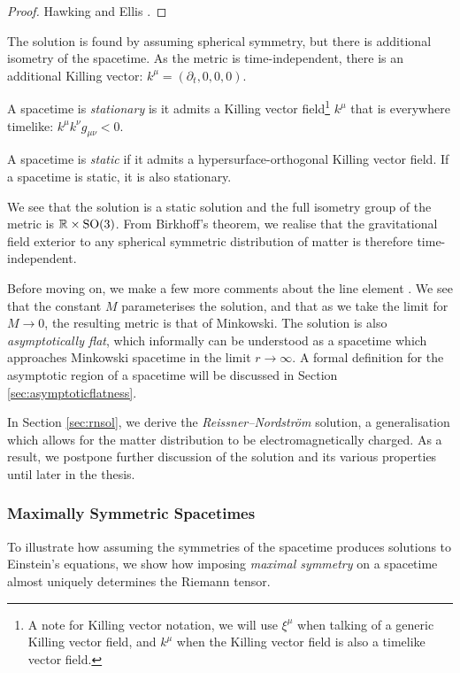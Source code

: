 \begin{proof}
	Hawking and Ellis \cite{Hawking:1973uf}.
\end{proof}

The \sch solution is found by assuming spherical symmetry, but there is additional isometry of the spacetime. As the metric  is time-independent, there is an additional Killing vector: $k^\mu = (\partial_t, 0,0,0)$.
\begin{defn}
	A spacetime is \emph{stationary} is it admits a Killing vector field\footnote{A note for Killing vector notation, we will use $\xi^\mu$ when talking of a generic Killing vector field, and $k^\mu$ when the Killing vector field is also a timelike vector field.} $k^\mu$ that is everywhere timelike: $k^\mu k^\nu g_{\mu \nu} < 0$.
\end{defn}
\begin{defn}
	A spacetime is \emph{static} if it admits a hypersurface-orthogonal Killing vector field. If a spacetime is static, it is also stationary.
\end{defn}
We see that the \sch solution is a static solution and the full isometry group of the metric is ${\mathbb{R}} \times \text{SO}(3)$. From Birkhoff's theorem, we realise that the gravitational field exterior to any spherical symmetric distribution of matter is therefore time-independent.

Before moving on, we make a few more comments about the line element . We see that the constant $M$ parameterises the solution, and that as we take the limit for $M \rightarrow 0$, the resulting metric is that of Minkowski. The \sch solution is also \emph{asymptotically flat}, which informally can be understood as a spacetime which approaches Minkowski spacetime in the limit $r \rightarrow \infty$. A formal definition for the asymptotic region of a spacetime will be discussed in Section \ref{sec:asymptoticflatness}.

In Section \ref{sec:rnsol}, we derive the \emph{Reissner–Nordstr\"om} solution, a generalisation which allows for the matter distribution to be electromagnetically charged. As a result, we postpone further discussion of the \sch solution and its various properties until later in the thesis.

\subsubsection{Maximally Symmetric Spacetimes}
\label{sec:maximallysymmetric}
To illustrate how assuming the symmetries of the spacetime produces solutions to Einstein's equations, we show how imposing \emph{maximal symmetry} on a spacetime almost uniquely determines the Riemann tensor.

